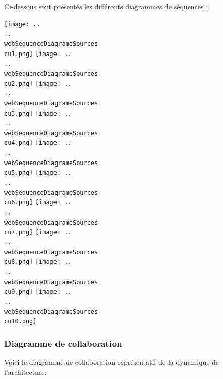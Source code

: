 Ci-dessous sont présentés les différents diagrammes de séquences :
\begin {center}
\texttt{[image: ..\\..\\webSequenceDiagrameSources\\cu1.png]}
\texttt{[image: ..\\..\\webSequenceDiagrameSources\\cu2.png]}
\texttt{[image: ..\\..\\webSequenceDiagrameSources\\cu3.png]}
\texttt{[image: ..\\..\\webSequenceDiagrameSources\\cu4.png]}
\texttt{[image: ..\\..\\webSequenceDiagrameSources\\cu5.png]}
\texttt{[image: ..\\..\\webSequenceDiagrameSources\\cu6.png]}
\texttt{[image: ..\\..\\webSequenceDiagrameSources\\cu7.png]}
\texttt{[image: ..\\..\\webSequenceDiagrameSources\\cu8.png]}
\texttt{[image: ..\\..\\webSequenceDiagrameSources\\cu9.png]}
\texttt{[image: ..\\..\\webSequenceDiagrameSources\\cu10.png]}
\end {center}

\subsubsection{Diagramme de collaboration}

Voici le diagramme de collaboration représentatif de la dynamique de
l'architecture:

